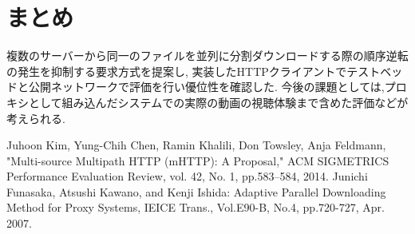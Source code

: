 \documentclass{ltjsarticle}
\begin{document}
\section{まとめ}
複数のサーバーから同一のファイルを並列に分割ダウンロードする際の順序逆転の発生を抑制する要求方式を提案し,
実装したHTTPクライアントでテストベッドと公開ネットワークで評価を行い優位性を確認した.
今後の課題としては,プロキシとして組み込んだシステムでの実際の動画の視聴体験まで含めた評価などが考えられる.
\vspace{-5mm}
\small
\begin{thebibliography}{2}

\small{
Juhoon Kim, Yung-Chih Chen, Ramin Khalili, Don Towsley, Anja Feldmann,
"Multi-source Multipath HTTP (mHTTP): A Proposal,"
ACM SIGMETRICS Performance Evaluation Review, vol. 42, No. 1, pp.583--584, 2014.
\small
Junichi Funasaka, Atsushi Kawano, and Kenji Ishida: Adaptive Parallel Downloading Method for Proxy Systems, IEICE Trans., Vol.E90-B, No.4, pp.720-727, Apr. 2007.}
\end{thebibliography}
\end{document}
